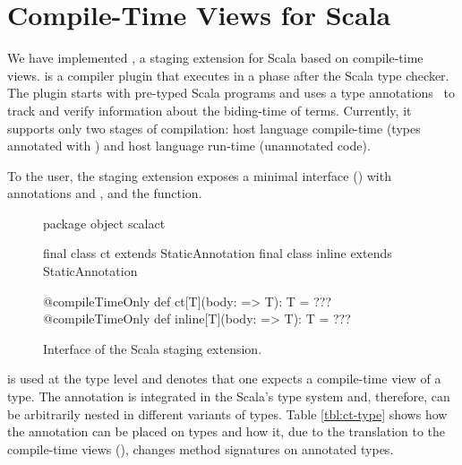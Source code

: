 \section{Compile-Time Views for Scala}
\label{sct:interface}

We have implemented \tool, a staging extension for Scala based on compile-time views.
 \tool is a compiler plugin that executes in a phase after the
 Scala type checker. The plugin starts with pre-typed Scala programs and uses a
 type annotations~\cite{odersky_1996_putting} to track and verify information about the biding-time
 of terms. Currently, it supports only two stages of compilation: host language compile-time
 (types annotated with ) and host language run-time (unannotated code).

To the user, the \tool staging extension exposes a minimal interface () with
annotations  and , and the  function.

\begin{figure}
\begin{listing}
package object scalact {

  final class ct extends StaticAnnotation
  final class inline extends StaticAnnotation

  @compileTimeOnly def ct[T](body: => T): T = ???
  @compileTimeOnly def inline[T](body: => T): T = ???

}
\end{listing}
\label{fig:interface}
\caption{Interface of the Scala staging extension.}
\end{figure}

 is used at the type level and denotes that one expects a
 compile-time view of a type. The annotation is integrated in the Scala's type system
 and, therefore, can be arbitrarily nested in different variants of types. Table
 \ref{tbl:ct-type} shows how the  annotation can be placed on types
 and how it, due to the translation to the compile-time views (),
 changes method signatures on annotated types.

